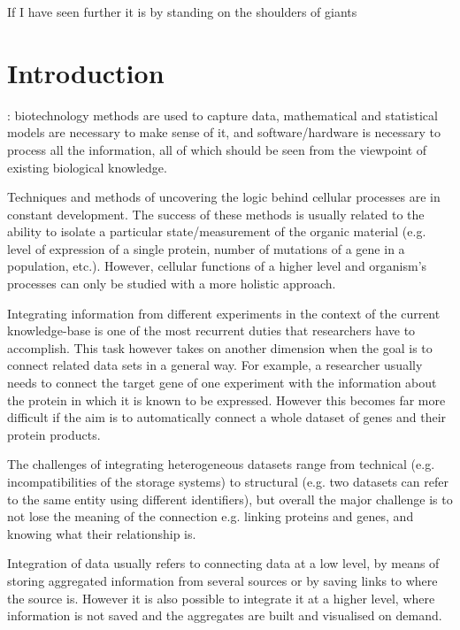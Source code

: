 \begin{savequote}[75mm] 
If I have seen further it is by standing on the shoulders of giants
\end{savequote}

\chapter{Introduction}

: biotechnology methods are used to capture data, mathematical and statistical models are necessary to make sense of it, and software/hardware is necessary to process all the information,  all of which should be seen from the viewpoint of existing biological knowledge.

Techniques and methods of uncovering the logic behind cellular processes are in constant development. The success of these methods is usually related to the ability to isolate a particular state/measurement of the organic material (e.g. level of expression of a single protein, number of mutations of a gene in a population, etc.). However,  cellular functions of a higher level and organism's processes can only be studied with a more holistic approach.

Integrating information from different experiments in the context of the current knowledge-base is one of the most recurrent duties that researchers have to accomplish. This task however takes on another dimension when the goal is to connect related data sets in a general way. For example, a researcher usually needs to connect the target gene of one experiment with the information about the protein in which it is known to be expressed.  However this becomes far more difficult if the aim is to automatically connect a whole dataset of genes and their protein products.

The challenges of integrating heterogeneous datasets range from technical (e.g. incompatibilities of the storage systems) to structural (e.g. two datasets can refer to the same entity using different identifiers), but overall the major challenge is to not lose the meaning of the connection e.g. linking proteins and genes, and knowing what their relationship is.

Integration of data usually refers to connecting data at a low level, by means of storing aggregated information from several sources or by saving links to where the source is. However it is also possible to integrate it at a higher level, where information is not saved and the aggregates are built and visualised on demand.

